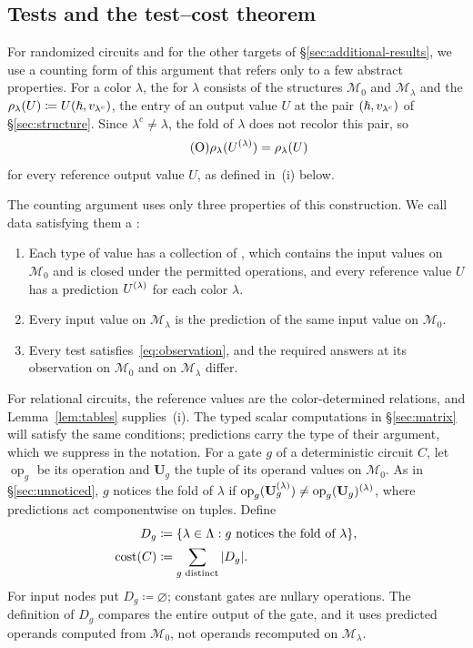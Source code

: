 \subsection{Tests and the test--cost theorem}\label{sec:simultaneous}
For randomized circuits and for the other targets of
\S\ref{sec:additional-results}, we use a counting form of this argument
that refers only to a few abstract properties. For a color $\lambda$,
the  for $\lambda$ consists of the structures $\mathcal M_0$
and $\mathcal M_\lambda$ and the 
$\rho_\lambda(U)\coloneqq U(\hslash,v_{\lambda^c})$, the entry of an output
value $U$ at the pair $(\hslash,v_{\lambda^c})$ of \S\ref{sec:structure}.
Since $\lambda^c\ne\lambda$, the fold of $\lambda$ does not recolor this
pair, so
\begin{equation*}\tag{O}\label{eq:observation}
 \rho_\lambda(U^{(\lambda)})=\rho_\lambda(U)
\end{equation*}
for every reference output value $U$, as defined in~(i) below.

The counting argument uses only three properties of this construction.
We call data satisfying them a :
\begin{enumerate}[label=(\roman*),leftmargin=*]
\item Each type of value has a collection of ,
which contains the input values on $\mathcal M_0$ and is closed under the
permitted operations, and every reference value $U$ has a prediction
$U^{(\lambda)}$ for each color $\lambda$.
\item Every input value on $\mathcal M_\lambda$ is the prediction of the
same input value on $\mathcal M_0$.
\item Every test satisfies~\eqref{eq:observation}, and the required
answers at its observation on $\mathcal M_0$ and on $\mathcal M_\lambda$
differ.
\end{enumerate}
For relational circuits, the reference values are the color-determined
relations, and Lemma~\ref{lem:tables} supplies~(i). The typed scalar
computations in \S\ref{sec:matrix} will satisfy the same conditions;
predictions carry the type of their argument, which we suppress in the
notation. For a gate $g$ of a deterministic circuit $C$, let
$\operatorname{op}_g$ be its operation and $\mathbf U_g$ the tuple of its
operand values on $\mathcal M_0$. As in \S\ref{sec:unnoticed}, $g$
notices the fold of $\lambda$ if
$\operatorname{op}_g(\mathbf U_g^{(\lambda)})\ne
\operatorname{op}_g(\mathbf U_g)^{(\lambda)}$, where predictions act
componentwise on tuples. Define
\[
 \begin{split}
 D_g&\coloneqq\{\lambda\in\Lambda:g\text{ notices the fold of }\lambda\},\\
 \operatorname{cost}(C)&\coloneqq\sum_{g\text{ distinct}}|D_g|.
 \end{split}
\]
For input nodes put $D_g\coloneqq\varnothing$; constant gates are nullary
operations. The definition of $D_g$ compares the entire output of the
gate, and it uses predicted operands computed from $\mathcal M_0$, not
operands recomputed on $\mathcal M_\lambda$.


